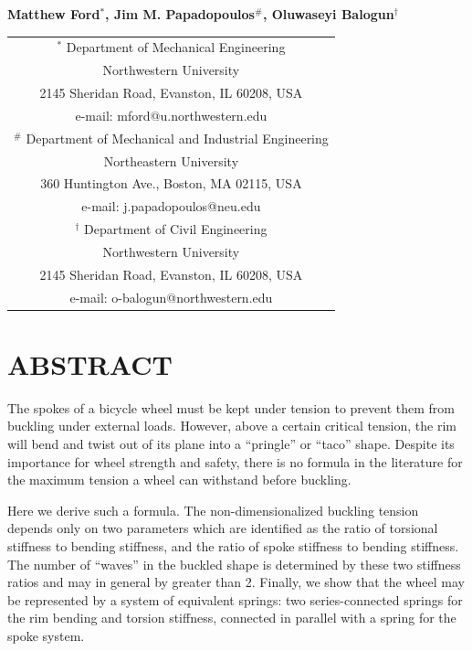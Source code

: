 \documentclass{bmd2016p}
\begin{document}
\begin{center}
\end{center}

\begin{center}
\normalsize{\bf{Matthew Ford$^{*}$, Jim M. Papadopoulos$^\#$, 
            Oluwaseyi Balogun$^\dag$}}
\end{center} 

\begin{center}
\begin{tabular}{c}
$^*$ Department of Mechanical Engineering\\
Northwestern University\\
2145 Sheridan Road, Evanston, IL 60208, USA\\
e-mail: mford@u.northwestern.edu\\[2.5ex]

$^\#$ Department of Mechanical and Industrial Engineering\\
Northeastern University\\
360 Huntington Ave., Boston, MA 02115, USA\\
e-mail: j.papadopoulos@neu.edu\\[2.5ex]

$^\dag$ Department of Civil Engineering\\
Northwestern University\\
2145 Sheridan Road, Evanston, IL 60208, USA\\
e-mail: o-balogun@northwestern.edu\\
\end{tabular}
\end{center}

\section*{ABSTRACT}
The spokes of a bicycle wheel must be kept under tension to prevent them from buckling under external loads. However, above a certain critical tension, the rim will bend and twist out of its plane into a ``pringle'' or ``taco'' shape. Despite its importance for wheel strength and safety, there is no formula in the literature for the maximum tension a wheel can withstand before buckling.

Here we derive such a formula. The non-dimensionalized buckling tension depends only on two parameters which are identified as the ratio of torsional stiffness to bending stiffness, and the ratio of spoke stiffness to bending stiffness. The number of ``waves'' in the buckled shape is determined by these two stiffness ratios and may in general by greater than 2. Finally, we show that the wheel may be represented by a system of equivalent springs: two series-connected springs for the rim bending and torsion stiffness, connected in parallel with a spring for the spoke system.
\end{document}
